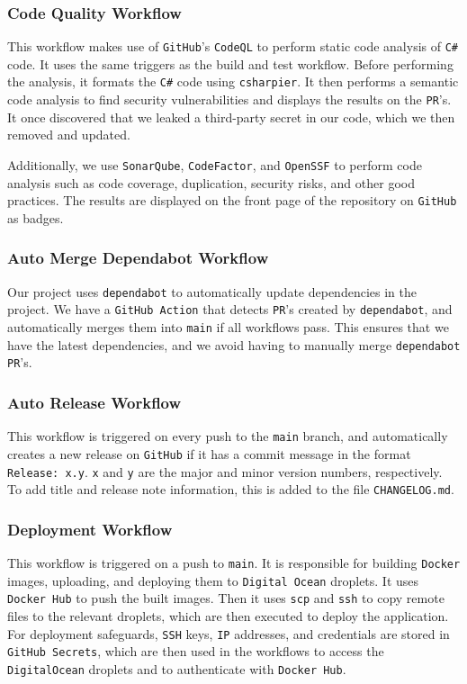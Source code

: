 \subsubsection{Code Quality Workflow}
This workflow makes use of \texttt{GitHub}'s \texttt{CodeQL}\cite{codeql} 
to perform static code analysis of \texttt{C\#} code.
It uses the same triggers as the build and test workflow.
Before performing the analysis, it formats the \texttt{C\#} code using 
\texttt{csharpier}\cite{csharpier}.
It then performs a semantic code analysis to find security 
vulnerabilities and displays the results on the \texttt{PR}'s.
It once discovered that we leaked a third-party secret 
in our code, which we then removed and updated.

Additionally, we use \texttt{SonarQube}\cite{sonarqube}, 
\texttt{CodeFactor}\cite{codefactor}, and \texttt{OpenSSF}\cite{Openssf} 
to perform code analysis such as code coverage, duplication, 
security risks, and other good practices.
The results are displayed on the front page of the repository 
on \texttt{GitHub} as badges.

\subsubsection{Auto Merge Dependabot Workflow}
Our project uses \texttt{dependabot} to automatically update
dependencies in the project.
We have a \texttt{GitHub Action} that detects \texttt{PR}'s 
created by \texttt{dependabot}, and automatically merges 
them into \texttt{main} if all workflows pass.
This ensures that we have the latest dependencies,
and we avoid having to manually merge \texttt{dependabot} 
\texttt{PR}'s.

\subsubsection{Auto Release Workflow}
This workflow is triggered on every push to the 
\texttt{main} branch, and automatically 
creates a new release on \texttt{GitHub} if it has
a commit message in the format \texttt{Release: x.y}. 
\texttt{x} and \texttt{y} are the major and minor version numbers, respectively.
To add title and release note information, 
this is added to the file \texttt{CHANGELOG.md}.

\subsubsection{Deployment Workflow}
This workflow is triggered on a push to \texttt{main}.
It is responsible for building \texttt{Docker} images, 
uploading, and deploying them to \texttt{Digital Ocean} droplets.
It uses \texttt{Docker Hub} to push the built images.
Then it uses \texttt{scp} and \texttt{ssh} to copy remote files 
to the relevant droplets, which are then executed to 
deploy the application. For deployment safeguards,
\texttt{SSH} keys, \texttt{IP} addresses, and credentials are stored in \texttt{GitHub Secrets},
which are then used in the workflows to access the \texttt{DigitalOcean} droplets and to 
authenticate with \texttt{Docker Hub}.


